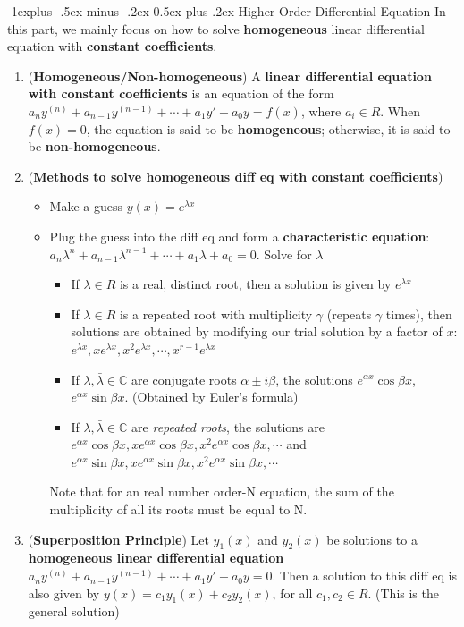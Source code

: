 \documentclass[10pt, landscape]{article}
\makeatletter
\renewcommand{\subsection}{\@startsection{subsection}{2}{0mm}%
                                {-1explus -.5ex minus -.2ex}%
                                {0.5ex plus .2ex}%
                                {\normalfont\normalsize\bfseries}}
\makeatother
\begin{document}
\begin{multicols}{4}
\subsection{Higher Order Differential Equation}
In this part, we mainly focus on how to solve \textbf{homogeneous} linear differential equation with \textbf{constant coefficients}.
\begin{enumerate}
    \item (\textbf{Homogeneous/Non-homogeneous}) A \textbf{linear differential equation with constant coefficients} is an equation of the form $a_ny^{(n)}+a_{n-1}y^{(n-1)}+\cdots+a_1y'+a_0y=f(x)$, where $a_i\in R$. When $f(x)=0$, the equation is said to be \textbf{homogeneous}; otherwise, it is said to be \textbf{non-homogeneous}.
    \item (\textbf{Methods to solve homogeneous diff eq with constant coefficients})
    \begin{itemize}
        \item Make a guess $y(x)=e^{\lambda x}$
        \item Plug the guess into the diff eq and form a \textbf{characteristic equation}: $a_n\lambda^n+a_{n-1}\lambda^{n-1}+\cdots+a_1\lambda+a_0=0$. Solve for $\lambda$
        \begin{itemize}
            \item If $\lambda \in R$ is a real, distinct root, then a solution is given by $e^{\lambda x}$
            \item If $\lambda \in R$ is a repeated root with multiplicity $\gamma$ (repeats $\gamma$ times), then solutions are obtained by modifying our trial solution by a factor of $x$: $e^{\lambda x}, xe^{\lambda x}, x^2e^{\lambda x},\cdots, x^{r-1}e^{\lambda x}$
            \item If $\lambda, \bar \lambda \in \mathbb{C}$ are conjugate roots $\alpha \pm i\beta$, the solutions $e^{\alpha x}\cos \beta x$, $e^{\alpha x}\sin \beta x$. (Obtained by Euler's formula)
            \item If $\lambda, \bar \lambda \in \mathbb{C}$ are \textit{repeated roots}, the solutions are $e^{\alpha x}\cos \beta x, xe^{\alpha x}\cos \beta x, x^2e^{\alpha x}\cos \beta x, \cdots$ and $e^{\alpha x}\sin \beta x, xe^{\alpha x}\sin \beta x, x^2e^{\alpha x}\sin \beta x, \cdots$
        \end{itemize}
        Note that for an real number order-N equation, the sum of the multiplicity of all its roots must be equal to N.
    \end{itemize}
    \item (\textbf{Superposition Principle}) Let $y_1(x)$ and $y_2(x)$ be solutions to a \textbf{homogeneous linear differential equation} $a_ny^{(n)}+a_{n-1}y^{(n-1)}+\cdots+a_1y'+a_0y=0$. Then a solution to this diff eq is also given by $y(x)=c_1y_1(x)+c_2y_2(x)$, for all $c_1, c_2 \in R$. (This is the general solution)
\end{enumerate}


\end{multicols}
\end{document}
